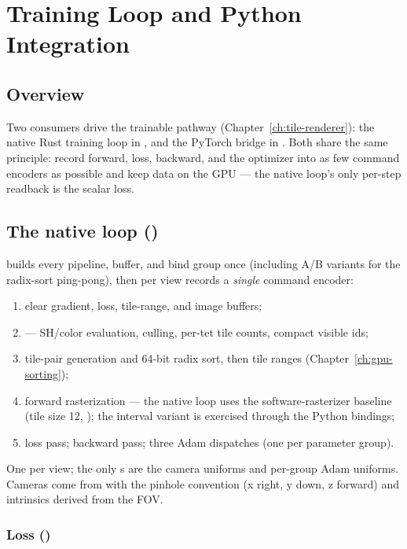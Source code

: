 \chapter{Training Loop and Python Integration}\label{ch:training-and-python}

\section{Overview}

Two consumers drive the trainable pathway (Chapter~\ref{ch:tile-renderer}):
the native Rust training loop in , and the PyTorch bridge
in . Both share the same principle: record forward,
loss, backward, and the optimizer into as few command encoders as possible
and keep data on the GPU --- the native loop's only per-step readback is the
scalar loss.

\section{The native loop ()}

 builds every pipeline, buffer, and bind group once (including
A/B variants for the radix-sort ping-pong), then per view records a
\emph{single} command encoder:

\begin{enumerate}
\item clear gradient, loss, tile-range, and image buffers;
\item {} --- SH/color evaluation, culling, per-tet tile
  counts, compact visible ids;
\item tile-pair generation and 64-bit radix sort, then tile ranges
  (Chapter~\ref{ch:gpu-sorting});
\item forward rasterization --- the native loop uses the
  software-rasterizer baseline (tile size 12,
  ); the interval variant is exercised
  through the Python bindings;
\item loss pass; backward pass; three Adam dispatches (one per parameter
  group).
\end{enumerate}

One  per view; the only s are the
camera uniforms and per-group Adam uniforms. Cameras come from
 with the pinhole convention (x right, y down, z
forward) and intrinsics derived from the FOV.

\subsection{Loss ()}


